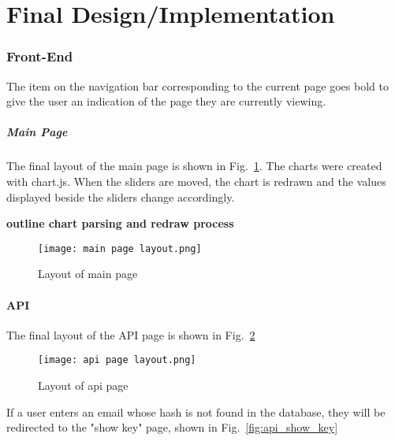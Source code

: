 \newpage
\part{Final Design/Implementation}

    \graphicspath{{images/finalDesign/}}

    \section{Front-End}

        The item on the navigation bar corresponding to the current page goes bold to give the user an indication of the page they are currently viewing.

        \subsubsection{Main Page}

        The final layout of the main page is shown in Fig.~\ref{fig:main_page_layout}. The charts were created with chart.js. When the sliders are moved, the chart is redrawn and the values displayed beside the sliders change accordingly.

        \textbf{outline chart parsing and redraw process}

        \begin{figure}[h]
            \centering
            \texttt{[image: main page layout.png]}
            \caption{Layout of main page}
            \label{fig:main_page_layout}
        \end{figure}

        \subsection{API}

            The final layout of the API page is shown in Fig.~\ref{fig:api_page_layout}

            \begin{figure}[h]
                \centering
                \texttt{[image: api page layout.png]}
                \caption{Layout of api page}
                \label{fig:api_page_layout}
            \end{figure}

            If a user enters an email whose hash is not found in the database, they will be redirected to the "show key" page, shown in Fig.~\ref{fig:api_show_key}

